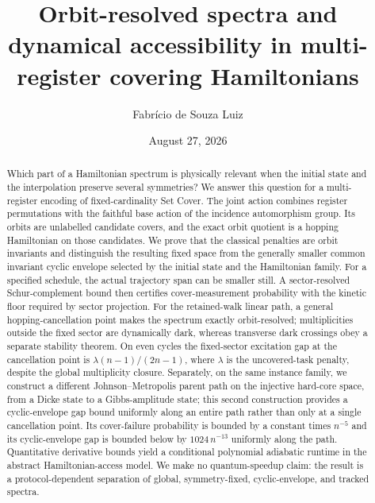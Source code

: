 \documentclass[twocolumn,superscriptaddress,a4paper,nopdfoutputerror]{quantumarticle}
\title{Orbit-resolved spectra and dynamical accessibility in
multi-register covering Hamiltonians}
\author{Fabrício de Souza Luiz}
\affiliation{Instituto de Física Gleb Wataghin, Universidade Estadual de Campinas,
13083-859 Campinas, SP, Brazil}
\date{August 27, 2026}
\begin{document}
\maketitle

\begin{abstract}
Which part of a Hamiltonian spectrum is physically relevant when the
initial state and the interpolation preserve several symmetries?  We answer
this question for a multi-register encoding of fixed-cardinality Set Cover.
The joint action combines register permutations with the faithful base
action of the incidence automorphism group.  Its orbits are unlabelled
candidate covers, and the exact orbit quotient is a hopping Hamiltonian on
those candidates.  We prove that the classical penalties are orbit
invariants and distinguish the resulting fixed space from the generally
smaller common invariant cyclic envelope selected by the initial state and
the Hamiltonian family.  For a specified schedule, the actual trajectory
span can be smaller still.  A sector-resolved
Schur-complement bound then certifies cover-measurement probability with the
kinetic floor required by sector projection.  For the retained-walk linear
path, a general hopping-cancellation point makes the spectrum exactly
orbit-resolved; multiplicities outside the fixed sector are dynamically
dark, whereas transverse dark crossings obey a separate stability theorem.
On even cycles the fixed-sector excitation gap at the cancellation point is
$\lambda(n-1)/(2n-1)$, where $\lambda$ is the uncovered-task penalty,
despite the global multiplicity closure.  Separately,
on the same instance family, we construct a different Johnson--Metropolis
parent path on the injective hard-core space, from a Dicke state to a
Gibbs-amplitude state; this second construction provides a cyclic-envelope
gap bound uniformly along an entire path rather than only at a single
cancellation point.  Its
cover-failure probability is bounded by a constant times $n^{-5}$ and its
cyclic-envelope gap is bounded below by $1024\,n^{-13}$ uniformly along the
path.
Quantitative derivative bounds yield a conditional polynomial adiabatic
runtime in the abstract Hamiltonian-access model.  We make no
quantum-speedup claim: the result is a protocol-dependent separation of
global, symmetry-fixed, cyclic-envelope, and tracked spectra.
\end{abstract}








\end{document}
